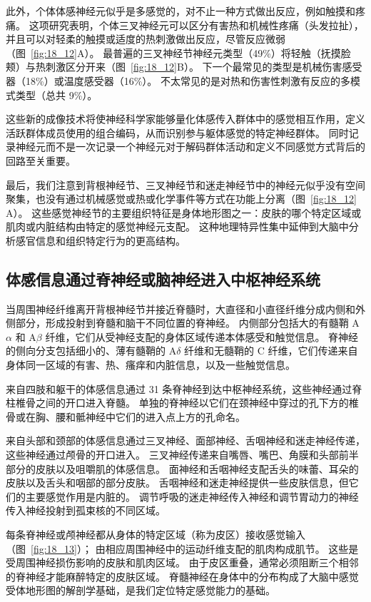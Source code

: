 此外，个体体感神经元似乎是多感觉的，对不止一种方式做出反应，例如触摸和疼痛。
这项研究表明，个体三叉神经元可以区分有害热和机械性疼痛（头发拉扯），并且可以对轻柔的触摸或适度的热刺激做出反应，尽管反应微弱（图~\ref{fig:18_12}A）。
最普遍的三叉神经节神经元类型（49\%）将轻触（抚摸脸颊）与热刺激区分开来（图~\ref{fig:18_12}B）。 
下一个最常见的类型是机械伤害感受器（18\%）或温度感受器（16\%）。
不太常见的是对热和伤害性刺激有反应的多模式类型（总共 9\%）。


这些新的成像技术将使神经科学家能够量化体感传入群体中的感觉相互作用，定义活跃群体成员使用的组合编码，从而识别参与躯体感觉的特定神经群体。
同时记录神经元而不是一次记录一个神经元对于解码群体活动和定义不同感觉方式背后的回路至关重要。


最后，我们注意到背根神经节、三叉神经节和迷走神经节中的神经元似乎没有空间聚集，也没有通过机械感觉或热或化学事件等方式在功能上分离（图~\ref{fig:18_12} A）。
这些感觉神经节的主要组织特征是身体地形图之一：皮肤的哪个特定区域或肌肉或内脏结构由特定的感觉神经元支配。
这种地理特异性集中延伸到大脑中分析感官信息和组织特定行为的更高结构。



\subsection{体感信息通过脊神经或脑神经进入中枢神经系统}

当周围神经纤维离开背根神经节并接近脊髓时，大直径和小直径纤维分成内侧和外侧部分，形成投射到脊髓和脑干不同位置的脊神经。
内侧部分包括大的有髓鞘 A$\alpha$ 和 A$\beta$ 纤维，它们从受神经支配的身体区域传递本体感受和触觉信息。
脊神经的侧向分支包括细小的、薄有髓鞘的 A$\delta$ 纤维和无髓鞘的 C 纤维，它们传递来自身体同一区域的有害、热、瘙痒和内脏信息，以及一些触觉信息。


来自四肢和躯干的体感信息通过 31 条脊神经到达中枢神经系统，这些神经通过脊柱椎骨之间的开口进入脊髓。 
单独的脊神经以它们在颈神经中穿过的孔下方的椎骨或在胸、腰和骶神经中它们的进入点上方的孔命名。


来自头部和颈部的体感信息通过三叉神经、面部神经、舌咽神经和迷走神经传递，这些神经通过颅骨的开口进入。 
三叉神经传递来自嘴唇、嘴巴、角膜和头部前半部分的皮肤以及咀嚼肌的体感信息。
面神经和舌咽神经支配舌头的味蕾、耳朵的皮肤以及舌头和咽部的部分皮肤。
舌咽神经和迷走神经提供一些皮肤信息，但它们的主要感觉作用是内脏的。
调节呼吸的迷走神经传入神经和调节胃动力的神经传入神经投射到孤束核的不同区域。


每条脊神经或颅神经都从身体的特定区域（称为皮区）接收感觉输入（图~\ref{fig:18_13}）；
由相应周围神经中的运动纤维支配的肌肉构成肌节。
这些是受周围神经损伤影响的皮肤和肌肉区域。
由于皮区重叠，通常必须阻断三个相邻的脊神经才能麻醉特定的皮肤区域。
脊髓神经在身体中的分布构成了大脑中感觉受体地形图的解剖学基础，是我们定位特定感觉能力的基础。


